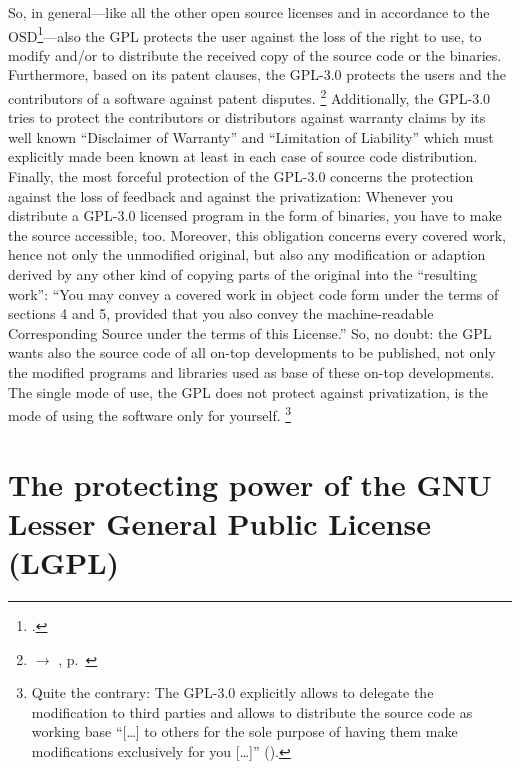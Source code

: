So, in general---like all the other open source licenses and in accordance to
the OSD\footcite[cf.][\nopage wp]{OSI2012a}---also the GPL protects the user
against the loss of the right to use, to modify and/or to distribute the
received copy of the source code or the binaries. 
Furthermore, based on its patent clauses, the GPL-3.0 protects the users and the
contributors of a software against patent disputes.%
  \footnote{$\rightarrow$ \oslic, p.\ }
Additionally, the GPL-3.0 tries to protect the contributors or distributors
against warranty claims by its well known \enquote{Disclaimer of
Warranty} and \enquote{Limitation of
Liability} which must explicitly made been known at least in  
each case of source code distribution. Finally, the most forceful
protection of the GPL-3.0 concerns the protection against the loss of feedback
and against the privatization: Whenever you distribute a GPL-3.0 licensed
program in the form of binaries, you have to make the source accessible,
too. Moreover, this obligation concerns every covered 
work, hence not only the unmodified original, but also any modification or
adaption derived by any other kind of copying parts of the original into the
\enquote{resulting work}: \enquote{You may convey a covered
work in object code form under the terms of sections 4 and 5, provided that you
also convey the machine-readable Corresponding Source under the terms of this
License.} So, no doubt: the GPL wants also the source code of
all on-top developments to be published, not only the modified programs and
libraries used as base of these on-top developments. The single mode of use, the
GPL does not protect against privatization, is the mode of using the software
only for yourself.%
  \footnote{Quite the contrary: The GPL-3.0 explicitly allows to
  delegate the modification to third parties and allows to distribute the source
  code as working base \enquote{[\ldots] to others for the sole purpose of having
  them make modifications exclusively for you [\ldots]} 
  (\cite[cf.][\nopage wp. §2]{Gpl30OsiLicense2007a}).}

\section{\texorpdfstring{The protecting power of the}{The} GNU Lesser General Public License (LGPL)}

